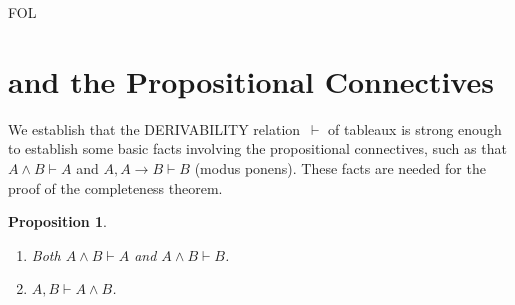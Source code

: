 \documentclass[10pt,a4paper]{article}
\newcommand*{\olup}[1]{\MakeUppercase{#1}}
\theoremstyle{plain}
\newtheorem{prop}[thm]{Proposition}
\theoremstyle{definition}
\theoremstyle{remark}
\newenvironment{explain}{}{}
\newcommand*{\olfileid}[3]{}
\newcommand*{\olsection}[1]{\section*{#1}}
\newcommand*{\ollabel}[1]{\label{#1}}
\providecommand{\lif}{\mathbin{\rightarrow}}
\providecommand{\Proves}{\mathrel{\vdash}}
\providecommand{\iftag}[1]{#1}
\providecommand{\iftag}{}
\begin{document}




\iftag{FOL}
      {\olfileid{fol}{tab}{ppr}}
      {\olfileid{pl}{tab}{ppr}}

\olsection{ and the Propositional Connectives}

\begin{explain}
  We establish that the \olup{derivability} relation~$\Proves$ of
  tableaux is strong enough to establish some basic facts involving
  the propositional connectives, such as that $A \land B \Proves A$
  and $A, A \lif B \Proves B$ (modus ponens). These facts are
  needed for the proof of the completeness theorem.
\end{explain}

\begin{prop}\ollabel{prop:provability-land}
  \begin{enumerate}
  \item \ollabel{prop:provability-land-left} Both $A \land B \Proves
    A$ and $A \land B \Proves B$.
  \item \ollabel{prop:provability-land-right} $A, B \Proves A \land
    B$.
  \end{enumerate}
\end{prop}
\end{document}
